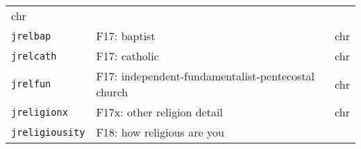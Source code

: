 \documentclass[]{article}
\begin{document}
\begin{longtable}[]{@{}lll@{}}
\begin{minipage}[t]{0.08\columnwidth}
chr\strut
\end{minipage}\tabularnewline
\begin{minipage}[t]{0.14\columnwidth}\raggedright\strut
\texttt{jrelbap}\strut
\end{minipage} & \begin{minipage}[t]{0.70\columnwidth}\raggedright\strut
F17: baptist\strut
\end{minipage} & \begin{minipage}[t]{0.08\columnwidth}\raggedright\strut
chr\strut
\end{minipage}\tabularnewline
\begin{minipage}[t]{0.14\columnwidth}\raggedright\strut
\texttt{jrelcath}\strut
\end{minipage} & \begin{minipage}[t]{0.70\columnwidth}\raggedright\strut
F17: catholic\strut
\end{minipage} & \begin{minipage}[t]{0.08\columnwidth}\raggedright\strut
chr\strut
\end{minipage}\tabularnewline
\begin{minipage}[t]{0.14\columnwidth}\raggedright\strut
\texttt{jrelfun}\strut
\end{minipage} & \begin{minipage}[t]{0.70\columnwidth}\raggedright\strut
F17: independent-fundamentalist-pentecostal church\strut
\end{minipage} & \begin{minipage}[t]{0.08\columnwidth}\raggedright\strut
chr\strut
\end{minipage}\tabularnewline
\begin{minipage}[t]{0.14\columnwidth}\raggedright\strut
\texttt{jreligionx}\strut
\end{minipage} & \begin{minipage}[t]{0.70\columnwidth}\raggedright\strut
F17x: other religion detail\strut
\end{minipage} & \begin{minipage}[t]{0.08\columnwidth}\raggedright\strut
chr\strut
\end{minipage}\tabularnewline
\begin{minipage}[t]{0.14\columnwidth}\raggedright\strut
\texttt{jreligiousity}\strut
\end{minipage} & \begin{minipage}[t]{0.70\columnwidth}\raggedright\strut
F18: how religious are you\strut
\end{minipage} & \begin{minipage}[t]{0.08\columnwidth}\raggedright\strut

\end{minipage}
\end{longtable}
\end{document}
